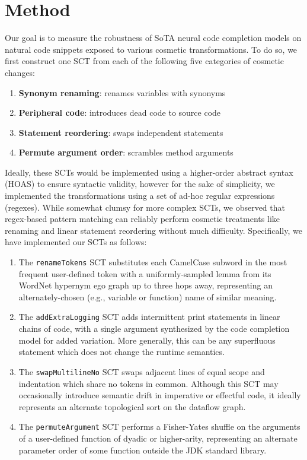 \documentclass[sigconf,review,anonymous]{acmart}
\begin{document}
  \pagebreak\section{Method}

  Our goal is to measure the robustness of SoTA neural code completion models on natural code snippets exposed to various cosmetic transformations. To do so, we first construct one SCT from each of the following five categories of cosmetic changes:

  \begin{enumerate}[itemsep=1ex]
    \item \textbf{Synonym renaming}: renames variables with synonyms
    \item \textbf{Peripheral code}: introduces dead code to source code
    \item \textbf{Statement reordering}: swaps independent statements
    \item \textbf{Permute argument order}: scrambles method arguments
  \end{enumerate}

  Ideally, these SCTs would be implemented using a higher-order abstract syntax (HOAS) to ensure syntactic validity, however for the sake of simplicity, we implemented the transformations using a set of ad-hoc regular expressions (regexes). While somewhat clumsy for more complex SCTs, we observed that regex-based pattern matching can reliably perform cosmetic treatments like renaming and linear statement reordering without much difficulty. Specifically, we have implemented our SCTs as follows:

  \begin{enumerate}[itemsep=1ex]
    \item The \lstinline|renameTokens| SCT substitutes each CamelCase subword in the most frequent user-defined token with a uniformly-sampled lemma from its WordNet hypernym ego graph up to three hops away, representing an alternately-chosen (e.g., variable or function) name of similar meaning.
    \item The \lstinline|addExtraLogging| SCT adds intermittent print statements in linear chains of code, with a single argument synthesized by the code completion model for added variation. More generally, this can be any superfluous statement which does not change the runtime semantics.
    \item The \lstinline|swapMultilineNo| SCT swaps adjacent lines of equal scope and indentation which share no tokens in common. Although this SCT may occasionally introduce semantic drift in imperative or effectful code, it ideally represents an alternate topological sort on the dataflow graph.
    \item The \lstinline|permuteArgument| SCT performs a Fisher-Yates shuffle on the arguments of a user-defined function of dyadic or higher-arity, representing an alternate parameter order of some function outside the JDK standard library.
  \end{enumerate}
\end{document}

